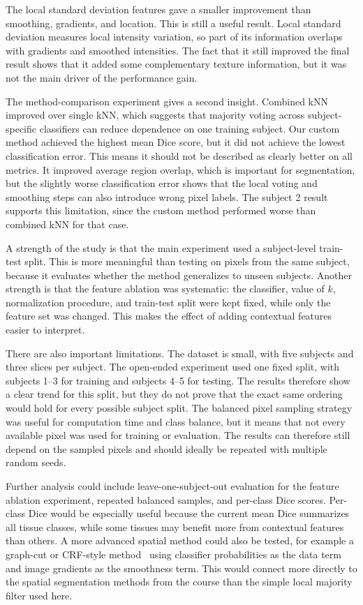 \documentclass[10pt,a4paper,twoside]{article}
\begin{document}
The local standard deviation features gave a smaller improvement than smoothing, gradients, and location. This is still a useful result. Local standard deviation measures local intensity variation, so part of its information overlaps with gradients and smoothed intensities. The fact that it still improved the final result shows that it added some complementary texture information, but it was not the main driver of the performance gain.

The method-comparison experiment gives a second insight. Combined kNN improved over single kNN, which suggests that majority voting across subject-specific classifiers can reduce dependence on one training subject. Our custom method achieved the highest mean Dice score, but it did not achieve the lowest classification error. This means it should not be described as clearly better on all metrics. It improved average region overlap, which is important for segmentation, but the slightly worse classification error shows that the local voting and smoothing steps can also introduce wrong pixel labels. The subject 2 result supports this limitation, since the custom method performed worse than combined kNN for that case.

A strength of the study is that the main experiment used a subject-level train-test split. This is more meaningful than testing on pixels from the same subject, because it evaluates whether the method generalizes to unseen subjects. Another strength is that the feature ablation was systematic: the classifier, value of $k$, normalization procedure, and train-test split were kept fixed, while only the feature set was changed. This makes the effect of adding contextual features easier to interpret.

There are also important limitations. The dataset is small, with five subjects and three slices per subject. The open-ended experiment used one fixed split, with subjects 1--3 for training and subjects 4--5 for testing. The results therefore show a clear trend for this split, but they do not prove that the exact same ordering would hold for every possible subject split. The balanced pixel sampling strategy was useful for computation time and class balance, but it means that not every available pixel was used for training or evaluation. The results can therefore still depend on the sampled pixels and should ideally be repeated with multiple random seeds.

Further analysis could include leave-one-subject-out evaluation for the feature ablation experiment, repeated balanced samples, and per-class Dice scores. Per-class Dice would be especially useful because the current mean Dice summarizes all tissue classes, while some tissues may benefit more from contextual features than others. A more advanced spatial method could also be tested, for example a graph-cut or CRF-style method~\cite{scannell2026graphcuts} using classifier probabilities as the data term and image gradients as the smoothness term. This would connect more directly to the spatial segmentation methods from the course than the simple local majority filter used here.
\end{document}
